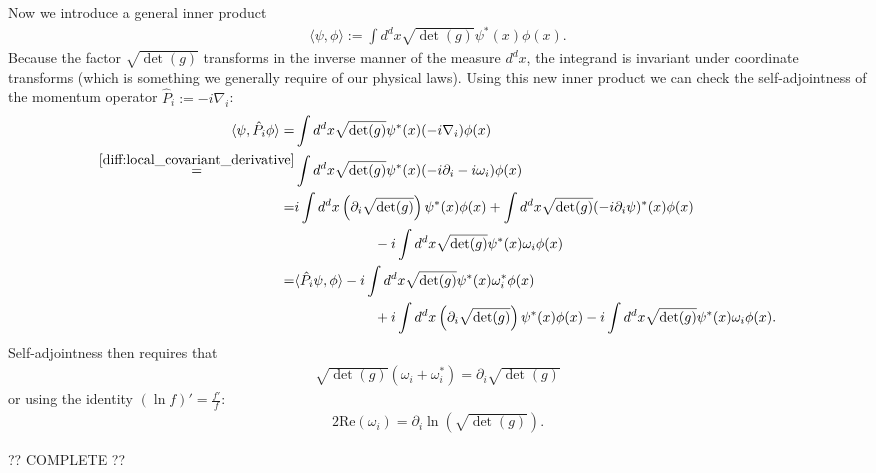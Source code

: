 \begin{construct}
        Now we introduce a general inner product
        \begin{gather}
            \langle\psi, \phi\rangle := \int d^dx\sqrt{\det(g)}\psi^*(x)\phi(x).
        \end{gather}
        Because the factor $\sqrt{\det(g)}$ transforms in the inverse manner of the measure $d^dx$, the integrand is invariant under coordinate transforms (which is something we generally require of our physical laws). Using this new inner product we can check the self-adjointness of the momentum operator $\hat{P}_i := -i\nabla_i$:
        \begin{align*}
            \langle\psi, \hat{P}_i\phi\rangle = &\int d^dx\sqrt{\det(g)}\psi^*(x)(-i\nabla_i)\phi(x)\\
            \overset{\ref{diff:local_covariant_derivative}}{=} &\int d^dx\sqrt{\det(g)}\psi^*(x)(-i\partial_i - i\omega_i)\phi(x)\\
            = &i\int d^dx\left(\partial_i\sqrt{\det(g)}\right)\psi^*(x)\phi(x) + \int d^dx\sqrt{\det(g)}(-i\partial_i\psi)^*(x)\phi(x)\\
                &\hspace{2cm} -i \int d^dx\sqrt{\det(g)}\psi^*(x)\omega_i\phi(x)\\
            = &\langle\hat{P}_i\psi, \phi\rangle -i \int d^dx\sqrt{\det(g)}\psi^*(x)\omega_i^*\phi(x)\\
                &\hspace{2cm} + i\int d^dx\left(\partial_i\sqrt{\det(g)}\right)\psi^*(x)\phi(x) -i \int d^dx\sqrt{\det(g)}\psi^*(x)\omega_i\phi(x).
        \end{align*}
        Self-adjointness then requires that
        \begin{gather}
            \sqrt{\det(g)}(\omega_i + \omega_i^*) = \partial_i\sqrt{\det(g)}
        \end{gather}
        or using the identity $(\ln f)' = \frac{f'}{f}$:
        \begin{gather}
            2\text{Re}(\omega_i) = \partial_i\ln\left(\sqrt{\det(g)}\right).
        \end{gather}
    \end{construct}

    ?? COMPLETE ??